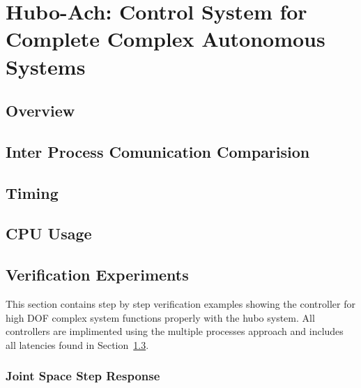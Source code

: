 \chapter{Hubo-Ach: Control System for Complete Complex Autonomous Systems}\label{sec:hubo-ach}

\section{Overview}




\section{Inter Process Comunication Comparision}
	
\section{Timing}\label{sec:timing}
	
\section{CPU Usage}
	
\section{Verification Experiments}\label{sec:simpleExamples}
This section contains step by step verification examples showing the controller for high DOF complex system functions properly with the hubo system.
All controllers are implimented using the multiple processes approach and includes all latencies found in Section~\ref{sec:timing}.

	\subsection{Joint Space Step Response}\label{sec:singlejointStep}
		

